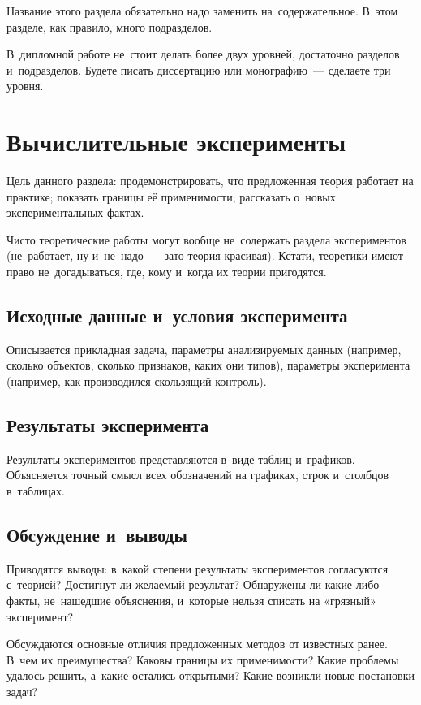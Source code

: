 \documentclass[12pt,fleqn]{article}
\begin{document}
Название этого раздела обязательно надо заменить на~содержательное.
В~этом разделе, как правило, много подразделов.

В~дипломной работе не~стоит делать более двух уровней, достаточно
разделов и~подразделов.  Будете писать диссертацию или монографию~---
сделаете три уровня.

\section{Вычислительные эксперименты}

Цель данного раздела: продемонстрировать, что предложенная теория
работает на практике; показать границы её применимости; рассказать
о~новых экспериментальных фактах.

Чисто теоретические работы могут вообще не~содержать раздела
экспериментов (не~работает, ну и~не~надо~--- зато теория красивая).
Кстати, теоретики имеют право не~догадываться, где, кому и~когда их
теории пригодятся.

\subsection{Исходные данные и~условия эксперимента}
Описывается прикладная задача, параметры анализируемых данных
(например, сколько объектов, сколько признаков, каких они типов),
параметры эксперимента (например, как производился скользящий
контроль).

\subsection{Результаты эксперимента}
Результаты экспериментов представляются в~виде таблиц и~графиков.
Объясняется точный смысл всех обозначений на графиках, строк
и~столбцов в~таблицах.

\subsection{Обсуждение и~выводы}
Приводятся выводы: в~какой степени результаты экспериментов
согласуются с~теорией?  Достигнут ли желаемый результат?  Обнаружены
ли какие-либо факты, не~нашедшие объяснения, и~которые нельзя списать
на «грязный» эксперимент?

Обсуждаются основные отличия предложенных методов от известных ранее.
В~чем их преимущества?  Каковы границы их применимости?  Какие
проблемы удалось решить, а~какие остались открытыми?  Какие возникли
новые постановки задач?
\end{document}

